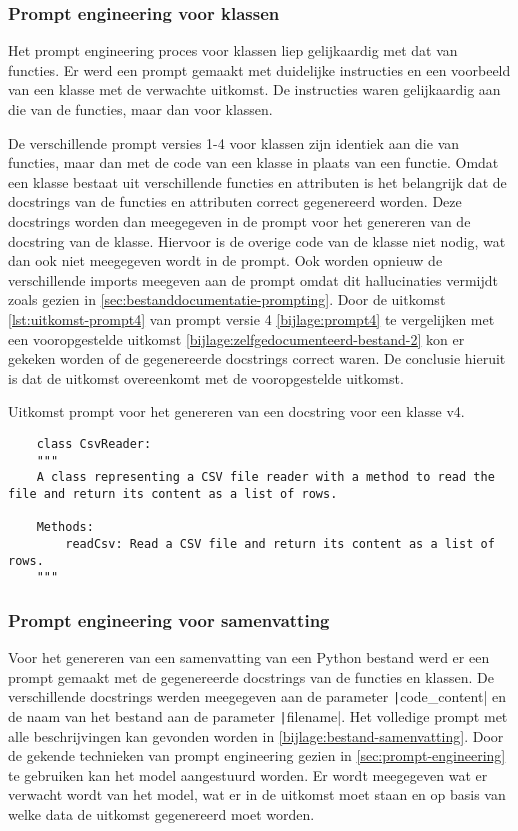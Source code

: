 \subsubsection{Prompt engineering voor klassen}
Het prompt engineering proces voor klassen liep gelijkaardig met dat van functies.
Er werd een prompt gemaakt met duidelijke instructies en een voorbeeld van een klasse met de verwachte uitkomst.
De instructies waren gelijkaardig aan die van de functies, maar dan voor klassen.

De verschillende prompt versies 1-4 voor klassen zijn identiek aan die van functies, maar dan met de code van een klasse in plaats van een functie.
Omdat een klasse bestaat uit verschillende functies en attributen is het belangrijk dat de docstrings van de functies en attributen correct gegenereerd worden.
Deze docstrings worden dan meegegeven in de prompt voor het genereren van de docstring van de klasse.
Hiervoor is de overige code van de klasse niet nodig, wat dan ook niet meegegeven wordt in de prompt.
Ook worden opnieuw de verschillende imports meegeven aan de prompt omdat dit hallucinaties vermijdt zoals gezien in \ref{sec:bestanddocumentatie-prompting}.
Door de uitkomst \ref{lst:uitkomst-prompt4} van prompt versie 4 \ref{bijlage:prompt4} te vergelijken met een vooropgestelde uitkomst \ref{bijlage:zelfgedocumenteerd-bestand-2} kon er gekeken worden of de gegenereerde docstrings correct waren.
De conclusie hieruit is dat de uitkomst overeenkomt met de vooropgestelde uitkomst. 

\begin{listing}
    \caption{Uitkomst prompt voor het genereren van een docstring voor een klasse v4.}
    \label{lst:uitkomst-prompt4}
    \begin{verbatim}
    class CsvReader:
    """
    A class representing a CSV file reader with a method to read the file and return its content as a list of rows.

    Methods:
        readCsv: Read a CSV file and return its content as a list of rows.
    """
    \end{verbatim}
\end{listing}

\subsubsection{Prompt engineering voor samenvatting}
Voor het genereren van een samenvatting van een Python bestand werd er een prompt gemaakt met de gegenereerde docstrings van de functies en klassen.
De verschillende docstrings werden meegegeven aan de parameter \texttt|code_content| en de naam van het bestand aan de parameter 
\texttt|filename|.
Het volledige prompt met alle beschrijvingen kan gevonden worden in \ref{bijlage:bestand-samenvatting}.
Door de gekende technieken van prompt engineering gezien in \ref{sec:prompt-engineering} te gebruiken kan het model aangestuurd worden.
Er wordt meegegeven wat er verwacht wordt van het model, wat er in de uitkomst moet staan en op basis van welke data de uitkomst gegenereerd moet worden.

